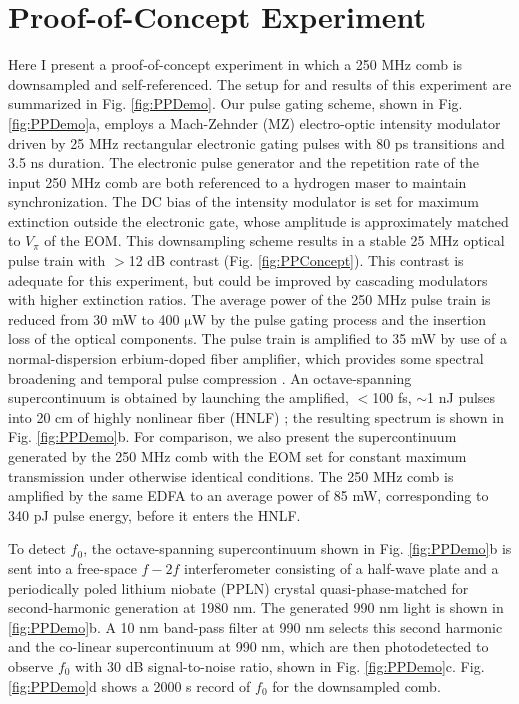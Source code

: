 \section{Proof-of-Concept Experiment}\label{sec:PPProofOfPrinciple}
Here I present a proof-of-concept experiment in which a 250 MHz comb is downsampled and self-referenced. The setup for and results of this experiment are summarized in Fig. \ref{fig:PPDemo}. Our pulse gating scheme, shown in Fig. \ref{fig:PPDemo}a, employs a Mach-Zehnder (MZ) electro-optic intensity modulator driven by 25 MHz rectangular electronic gating pulses with 80 ps transitions and 3.5 ns duration. The electronic pulse generator and the repetition rate of the input 250 MHz comb are both referenced to a hydrogen maser to maintain synchronization. The DC bias of the intensity modulator is set for maximum extinction outside the electronic gate, whose amplitude is approximately matched to $V_\pi$ of the EOM. This downsampling scheme results in a stable 25 MHz optical pulse train with $>$12 dB contrast (Fig. \ref{fig:PPConcept}). This contrast is adequate for this experiment, but could be improved by cascading modulators with higher extinction ratios.  The average power of the 250 MHz pulse train is reduced from 30 mW to 400 $\mathrm{\mu}$W by the pulse gating process and the insertion loss of the optical components. The pulse train is amplified to 35 mW by use of a normal-dispersion erbium-doped fiber amplifier, which provides some spectral broadening and temporal pulse compression \cite{Fermann2000}. An octave-spanning supercontinuum is obtained by launching the amplified, $<$100 fs, $\sim$1 nJ pulses into 20 cm of highly nonlinear fiber (HNLF) \cite{Hirano2009}; the resulting spectrum is shown in Fig. \ref{fig:PPDemo}b.  For comparison, we also present the supercontinuum generated by the 250 MHz comb with the EOM set for constant maximum transmission under otherwise identical conditions. The 250 MHz comb is amplified by the same EDFA to an average power of 85 mW, corresponding to 340 pJ pulse energy, before it enters the HNLF.

To detect $f_0$, the octave-spanning supercontinuum shown in Fig. \ref{fig:PPDemo}b is sent into a free-space $f-2f$ interferometer consisting of a half-wave plate and a periodically poled lithium niobate (PPLN) crystal quasi-phase-matched for second-harmonic generation at 1980 nm. The generated 990 nm light is shown in \ref{fig:PPDemo}b. A 10 nm band-pass filter at 990 nm selects this second harmonic and the co-linear supercontinuum at 990 nm, which are then photodetected to observe $f_0$ with 30 dB signal-to-noise ratio, shown in Fig. \ref{fig:PPDemo}c. Fig. \ref{fig:PPDemo}d shows a 2000 s record of $f_0$ for the downsampled comb.




